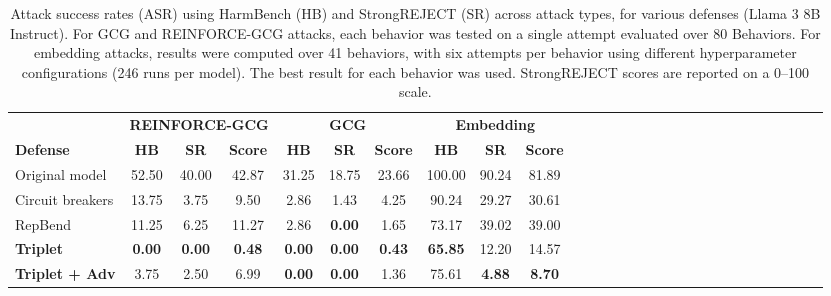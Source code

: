 \documentclass[11pt]{article}
\begin{document}
\begin{table}[ht]
\centering
\setlength{\tabcolsep}{4pt}
\begin{tabular}{l
                *{3}{ccc}@{\quad}
                *{3}{ccc}@{\quad}
                *{3}{ccc}}
\hline
 & \multicolumn{3}{c}{\textbf{REINFORCE-GCG}} 
 & \multicolumn{3}{c}{\textbf{GCG}} 
 & \multicolumn{3}{c}{\textbf{Embedding}} \\
\cmidrule(lr){2-4} \cmidrule(lr){5-7} \cmidrule(lr){8-10}
\textbf{Defense}
 & \textbf{HB} & \textbf{SR} & \textbf{Score}
 & \textbf{HB} & \textbf{SR} & \textbf{Score}
 & \textbf{HB} & \textbf{SR} & \textbf{Score} \\
\hline
Original model 
 & 52.50 & 40.00 & 42.87
 & 31.25 & 18.75 & 23.66
 & 100.00 & 90.24 & 81.89 \\

Circuit breakers 
 & 13.75 &  3.75 &  9.50
 &  2.86 &  1.43 &  4.25
 &  90.24 & 29.27 & 30.61 \\

RepBend 
 & 11.25 &  6.25 & 11.27
 &  2.86 & \textbf{0.00} &  1.65
 &  73.17 & 39.02 & 39.00 \\

\hline
\textbf{Triplet} 
 & \textbf{0.00} & \textbf{0.00} & \textbf{0.48}
 & \textbf{0.00} & \textbf{0.00} & \textbf{0.43}
 &  \textbf{65.85} & 12.20 & 14.57 \\

\textbf{Triplet + Adv} 
 &  3.75 &  2.50 &  6.99
 & \textbf{0.00} & \textbf{0.00} & 1.36
 &  75.61 & \textbf{4.88} & \textbf{8.70} \\
\hline
\end{tabular}
\caption{Attack success rates (ASR) using HarmBench (HB) and StrongREJECT (SR) across attack types, for various defenses (Llama 3 8B Instruct).
For GCG and REINFORCE-GCG attacks, each behavior was tested on a single attempt evaluated over 80 Behaviors. For embedding attacks, results were computed over 41 behaviors, with six attempts per behavior using different hyperparameter configurations (246 runs per model). The best result for each behavior was used. StrongREJECT scores are reported on a 0--100 scale.
}
\label{tab:all_attacks}
\end{table}
\end{document}

